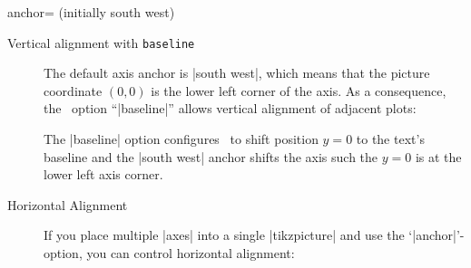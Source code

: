 \begin{pgfplotskey}{anchor= (initially south west)}
\begin{description}
\item[Vertical alignment with \texttt{baseline}]
\label{sec:align}%
The default axis anchor is |south west|, which means that the picture coordinate $(0,0)$ is the lower left corner of the axis. As a consequence, the \Tikz\ option ``|baseline|'' allows vertical alignment of adjacent plots:
\begin{codeexample}[]
\tikzset{domain=-1:1}
%
\hspace{0.15cm}
\end{codeexample}

\begin{codeexample}[]
\tikzset{domain=-1:1}
%
\hspace{0.15cm}
\end{codeexample}
The |baseline| option configures \Tikz\ to shift position $y=0$ to the text's baseline and the |south west| anchor shifts the axis such the $y=0$ is at the lower left axis corner.


\item[Horizontal Alignment]
\label{sec:halign}%
If you place multiple |axes| into a single |tikzpicture| and use the `|anchor|'-option, you can control horizontal alignment:
\begin{codeexample}[]
\end{codeexample}
\end{description}
\end{pgfplotskey}
